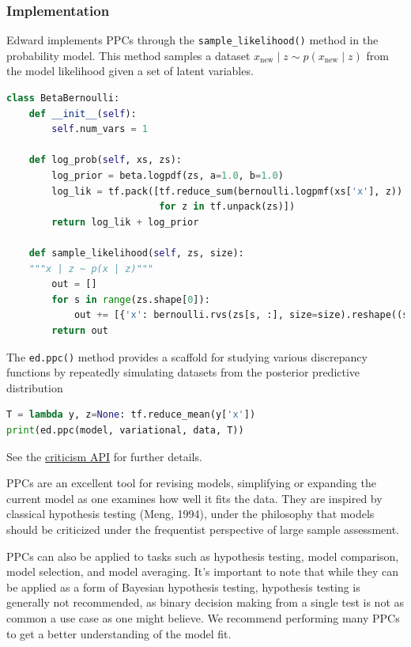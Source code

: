\subsubsection{Implementation}

Edward implements PPCs through the \texttt{sample_likelihood()}
method in the probability model. This method samples a dataset
$x_{\text{new}}\mid z\sim p(x_{\text{new}}\mid z)$ from the
model likelihood given a set of latent variables.
\begin{lstlisting}[language=Python]
class BetaBernoulli:
    def __init__(self):
        self.num_vars = 1

    def log_prob(self, xs, zs):
        log_prior = beta.logpdf(zs, a=1.0, b=1.0)
        log_lik = tf.pack([tf.reduce_sum(bernoulli.logpmf(xs['x'], z))
                           for z in tf.unpack(zs)])
        return log_lik + log_prior

    def sample_likelihood(self, zs, size):
    """x | z ~ p(x | z)"""
        out = []
        for s in range(zs.shape[0]):
            out += [{'x': bernoulli.rvs(zs[s, :], size=size).reshape((size,))}]
        return out
\end{lstlisting}

The \texttt{ed.ppc()} method provides a scaffold for studying
various discrepancy functions by repeatedly simulating datasets from the
posterior predictive distribution
\begin{lstlisting}[language=Python]
T = lambda y, z=None: tf.reduce_mean(y['x'])
print(ed.ppc(model, variational, data, T))
\end{lstlisting}

See the \href{api/criticisms.html}{criticism API} for further details.

PPCs are an excellent tool for revising models, simplifying or
expanding the current model as one examines how well it fits the data.
They are inspired by classical hypothesis testing (Meng, 1994),
under the philosophy that models should be criticized under the
frequentist perspective of large sample assessment.

PPCs can also be applied to tasks such as hypothesis testing, model
comparison, model selection, and model averaging.  It's important to
note that while they can be applied as a form of Bayesian hypothesis
testing, hypothesis testing is generally not recommended, as binary
decision making from a single test is not as common a use case as one
might believe. We recommend performing many PPCs to get a better
understanding of the model fit.

